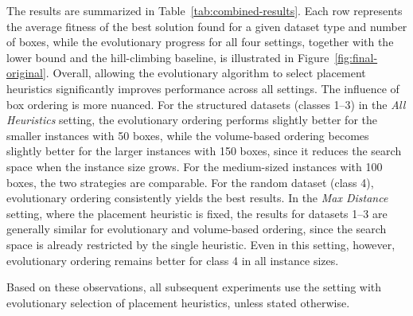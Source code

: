 The results are summarized in Table~\ref{tab:combined-results}. 
Each row represents the average fitness of the best solution found for a given dataset type and number of boxes, 
while the evolutionary progress for all four settings, together with the lower bound and the hill-climbing baseline, is illustrated in Figure~\ref{fig:final-original}.
Overall, allowing the evolutionary algorithm to select placement heuristics significantly improves performance across all settings. 
The influence of box ordering is more nuanced. 
For the structured datasets (classes 1--3) in the \emph{All Heuristics} setting, the evolutionary ordering performs slightly better for the smaller instances with 50 boxes, 
while the volume-based ordering becomes slightly better for the larger instances with 150 boxes, 
since it reduces the search space when the instance size grows. 
For the medium-sized instances with 100 boxes, the two strategies are comparable. 
For the random dataset (class 4), evolutionary ordering consistently yields the best results. 
In the \emph{Max Distance} setting, where the placement heuristic is fixed, the results for datasets 1--3 are 
generally similar for evolutionary and volume-based ordering, since the search space is already restricted by the single heuristic. 
Even in this setting, however, evolutionary ordering remains better for class 4 in all instance sizes.

Based on these observations, all subsequent experiments use the setting 
with evolutionary selection of placement heuristics, unless stated otherwise.

